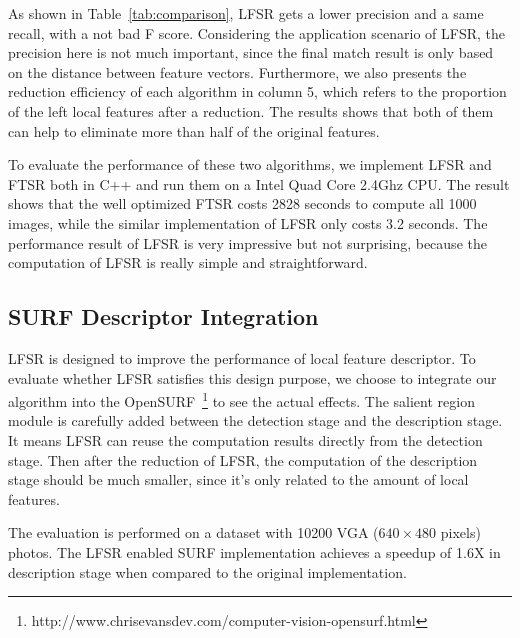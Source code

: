 As shown in Table~\ref{tab:comparison}, LFSR gets a lower precision and a same recall, with a not bad F score. Considering the application scenario of LFSR, the precision here is not much important, since the final match result is only based on the distance between feature vectors. Furthermore, we also presents the reduction efficiency of each algorithm in column 5, which refers to the proportion of the left local features after a reduction. The results shows that both of them can help to eliminate more than half of the original features.

To evaluate the performance of these two algorithms, we implement LFSR and FTSR both in C++ and run them on a Intel Quad Core 2.4Ghz CPU. The result shows that the well optimized FTSR costs 2828 seconds to compute all 1000 images, while the similar implementation of LFSR only costs 3.2 seconds. The performance result of LFSR is very impressive but not surprising, because the computation of LFSR is really simple and straightforward.

\subsection{SURF Descriptor Integration}
\label{sec:observaion_integration}

LFSR is designed to improve the performance of local feature descriptor. To evaluate whether LFSR satisfies this design purpose, we choose to integrate our algorithm into the OpenSURF~\footnote{http://www.chrisevansdev.com/computer-vision-opensurf.html} to see the actual effects. The salient region module is carefully added between the detection stage and the description stage. It means LFSR can reuse the computation results directly from the detection stage. Then after the reduction of LFSR, the computation of the description stage should be much smaller, since it's only related to the amount of local features.

The evaluation is performed on a dataset\cite{nister-stewenius-cvpr-2006} with 10200 VGA ($640\times480$ pixels) photos. The LFSR enabled SURF implementation achieves a speedup of 1.6X in description stage when compared to the original implementation.